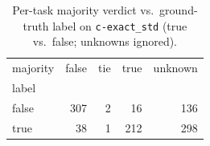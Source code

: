 \begin{table}[t]
  \centering
  \caption{Per-task majority verdict vs.\ ground-truth label on \texttt{c-exact_std} (true vs.\ false; unknowns ignored).}
  \label{tab:majority-c-exact_std}
\begin{tabular}{lrrrr}
\toprule
majority & false & tie & true & unknown \\
label &  &  &  &  \\
\midrule
false & 307 & 2 & 16 & 136 \\
true & 38 & 1 & 212 & 298 \\
\bottomrule
\end{tabular}
\end{table}
